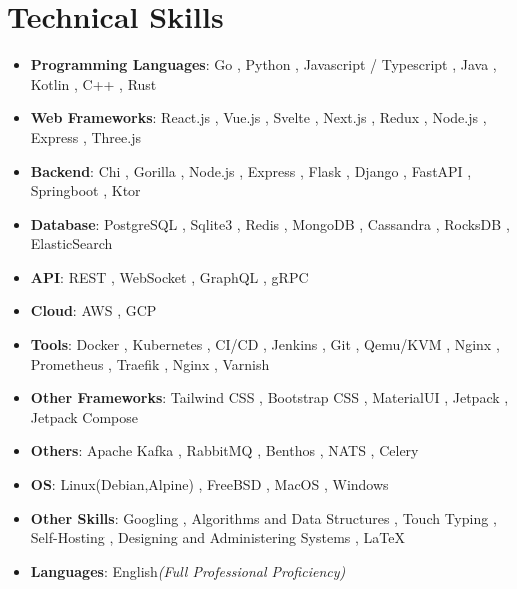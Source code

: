 \documentclass[letterpaper,11pt]{article}
\newcommand{\resumeSubHeadingListStart}{\begin{itemize}[leftmargin=*]}
\newcommand{\resumeSubHeadingListEnd}{\end{itemize}}
\newcommand{\resumeSubItem}[2]{\resumeItem{#1}{#2}\vspace{-4pt}}
\newcommand{\resumeItem}[2]{
  \item\small{
    \textbf{#1}{: #2 \vspace{-2pt}}
  }
}
\begin{document}
\setlength{\columnsep}{1cm}
\section{Technical Skills}
\resumeSubHeadingListStart
\resumeSubItem{Programming Languages}
{Go , Python , Javascript / Typescript , Java , Kotlin , C++ , Rust }
\resumeSubItem{Web Frameworks}
{React.js , Vue.js , Svelte , Next.js , Redux , Node.js , Express , Three.js}
\resumeSubItem{Backend}
{Chi , Gorilla , Node.js , Express , Flask , Django , FastAPI , Springboot , Ktor}
\resumeSubItem{Database}
{PostgreSQL , Sqlite3 , Redis , MongoDB , Cassandra , RocksDB , ElasticSearch}
\resumeSubItem{API}
{REST , WebSocket , GraphQL , gRPC}
\resumeSubItem{Cloud}
{AWS , GCP}
\resumeSubItem{Tools}
{Docker , Kubernetes , CI/CD , Jenkins , Git , Qemu/KVM , Nginx , Prometheus , Traefik , Nginx , Varnish }
\resumeSubItem{Other Frameworks}
{Tailwind CSS , Bootstrap CSS , MaterialUI , Jetpack , Jetpack Compose}
\resumeSubItem{Others}
{ Apache Kafka , RabbitMQ , Benthos , NATS , Celery}
\resumeSubItem{OS}
{Linux(Debian,Alpine) , FreeBSD , MacOS , Windows}
\resumeSubItem{Other Skills}
{Googling , Algorithms and Data Structures , Touch Typing , Self-Hosting , Designing and Administering Systems , \LaTeX}
\resumeSubItem{Languages}
{English\emph{(Full Professional Proficiency)}}
\resumeSubHeadingListEnd




\end{document}
